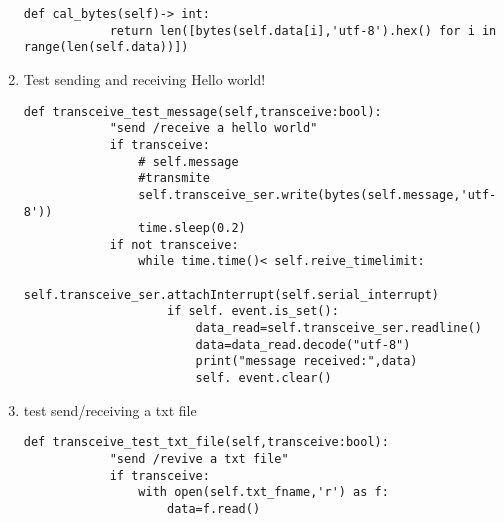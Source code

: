 \begin{enumerate}
    \begin{lstlisting}[style=mystyle]
        def cal_bytes(self)-> int:
		    return len([bytes(self.data[i],'utf-8').hex() for i in range(len(self.data))])
    \end{lstlisting}
    \item Test sending and receiving Hello world!
    \begin{lstlisting}[style=mystyle]
        def transceive_test_message(self,transceive:bool):
            "send /receive a hello world"
            if transceive:
                # self.message
                #transmite
                self.transceive_ser.write(bytes(self.message,'utf-8'))
                time.sleep(0.2)
            if not transceive:
                while time.time()< self.reive_timelimit:
                    self.transceive_ser.attachInterrupt(self.serial_interrupt)
                    if self. event.is_set():
                        data_read=self.transceive_ser.readline()
                        data=data_read.decode("utf-8")
                        print("message received:",data)
                        self. event.clear()
    \end{lstlisting}
    \item test send/receiving a txt file
    \begin{lstlisting}[style=mystyle]
        def transceive_test_txt_file(self,transceive:bool):
            "send /revive a txt file"
            if transceive:
                with open(self.txt_fname,'r') as f:
                    data=f.read()


\end{lstlisting}
\end{enumerate}
